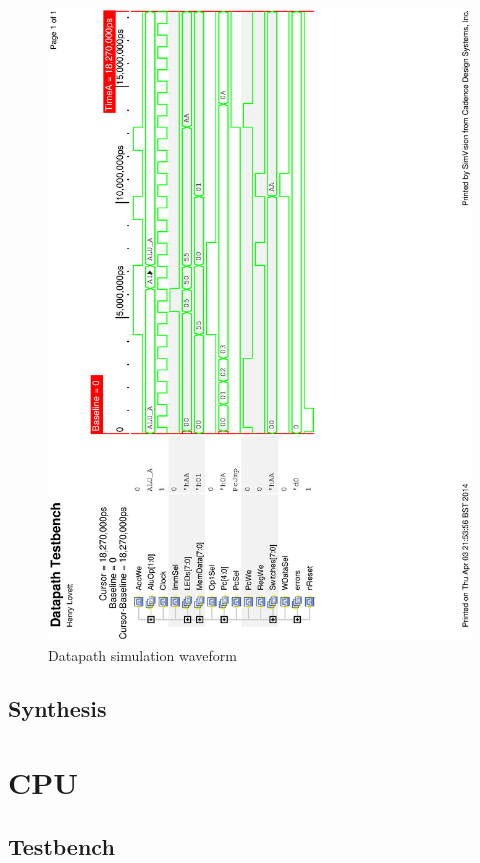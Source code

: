 \begin{figure}
\includegraphics[height=\textheight]{Figures/datapathsim.eps}
\caption{Datapath simulation waveform}
\label{fig:datapathsim}
\end{figure}

\subsection{Synthesis}

\section{CPU}
\subsection{Testbench}

